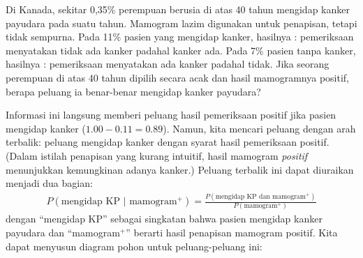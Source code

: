\begin{examplewrap}
\begin{nexample}{Di Kanada, sekitar 0,35\% perempuan berusia di atas 40 tahun
    mengidap kanker payudara pada suatu tahun.
    Mamogram lazim digunakan untuk penapisan, tetapi tidak sempurna.
    Pada 11\% pasien yang mengidap kanker, hasilnya :
    pemeriksaan menyatakan tidak ada kanker padahal kanker ada.
    Pada 7\% pasien tanpa kanker, hasilnya :
    pemeriksaan menyatakan ada kanker padahal tidak.
    Jika seorang perempuan di atas 40 tahun dipilih secara acak dan hasil
    mamogramnya positif, berapa peluang ia benar-benar mengidap kanker payudara?}

\label{probBreastCancerGivenPositiveTestExample}

Informasi ini langsung memberi peluang hasil pemeriksaan positif jika pasien mengidap kanker ($1.00-0.11=0.89$). Namun, kita mencari peluang dengan arah terbalik: peluang mengidap kanker dengan syarat hasil pemeriksaan positif. (Dalam istilah penapisan yang kurang intuitif, hasil mamogram \emph{positif} menunjukkan kemungkinan adanya kanker.) Peluang terbalik ini dapat diuraikan menjadi dua bagian:
\begin{align*}
P(\text{mengidap KP } | \text{ mamogram$^+$}) = \frac{P(\text{mengidap KP dan mamogram$^+$})}{P(\text{mamogram$^+$})}
\end{align*}
dengan ``mengidap KP'' sebagai singkatan bahwa pasien mengidap
kanker payudara dan ``mamogram$^+$'' berarti hasil penapisan mamogram
positif.
Kita dapat menyusun diagram pohon untuk peluang-peluang ini:
\begin{center}

\end{center}
\end{nexample}
\end{examplewrap}
